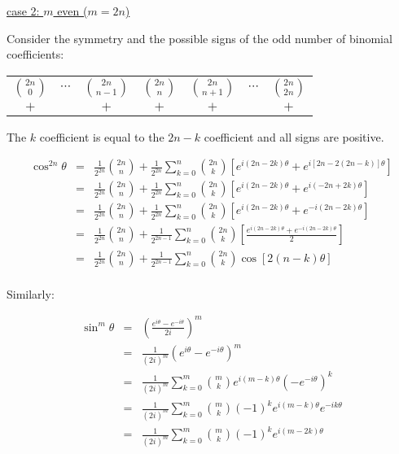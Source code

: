 \documentclass[letterpaper,12pt,fleqn]{article}
\renewcommand{\o}{\theta}
\begin{document}
\begin{theproof}
\begin{description}
\item{\underline{case 2: $m$ even ($m=2n$)}}

Consider the symmetry and the possible signs of the odd number of binomial
coefficients:

\begin{tabular}{ccccccc}
$\binom{2n}{0}$ & $\cdots$ & $\binom{2n}{n-1}$ & $\binom{2n}{n}$ &
    $\binom{2n}{n+1}$ & $\cdots$ & $\binom{2n}{2n}$ \\
$+$ & & $+$ & $+$ & $+$ & & $+$ \\
\end{tabular}

The $k$ coefficient is equal to the $2n-k$ coefficient and all signs are
positive.

\begin{eqnarray*}
\cos^{2n}\o &=& \frac{1}{2^{2n}}\binom{2n}{n}+
        \frac{1}{2^{2n}}\sum_{k=0}^n\binom{2n}{k}
        \left[e^{i(2n-2k)\o}+e^{i[2n-2(2n-k)]\o}\right] \\
    &=& \frac{1}{2^{2n}}\binom{2n}{n}+
        \frac{1}{2^{2n}}\sum_{k=0}^n\binom{2n}{k}
        \left[e^{i(2n-2k)\o}+e^{i(-2n+2k)\o}\right] \\
    &=& \frac{1}{2^{2n}}\binom{2n}{n}+
        \frac{1}{2^{2n}}\sum_{k=0}^n\binom{2n}{k}
        \left[e^{i(2n-2k)\o}+e^{-i(2n-2k)\o}\right] \\
    &=& \frac{1}{2^{2n}}\binom{2n}{n}+
        \frac{1}{2^{2n-1}}\sum_{k=0}^n\binom{2n}{k}
        \left[\frac{e^{i(2n-2k)\o}+e^{-i(2n-2k)\o}}{2}\right] \\
    &=& \frac{1}{2^{2n}}\binom{2n}{n}+
        \frac{1}{2^{2n-1}}\sum_{k=0}^n\binom{2n}{k}\cos[2(n-k)\o] \\
\end{eqnarray*}
\end{description}

Similarly:

\begin{eqnarray*}
\sin^m\o &=& \left(\frac{e^{i\o}-e^{-i\o}}{2i}\right)^m \\
    &=& \frac{1}{(2i)^m}\left(e^{i\o}-e^{-i\o}\right)^m \\
    &=& \frac{1}{(2i)^m}\sum_{k=0}^m\binom{m}{k}
        e^{i(m-k)\o}\left(-e^{-i\o}\right)^k \\
    &=& \frac{1}{(2i)^m}\sum_{k=0}^m\binom{m}{k}(-1)^ke^{i(m-k)\o}e^{-ik\o} \\
    &=& \frac{1}{(2i)^m}\sum_{k=0}^m\binom{m}{k}(-1)^ke^{i(m-2k)\o} \\
\end{eqnarray*}


\end{theproof}
\end{document}
